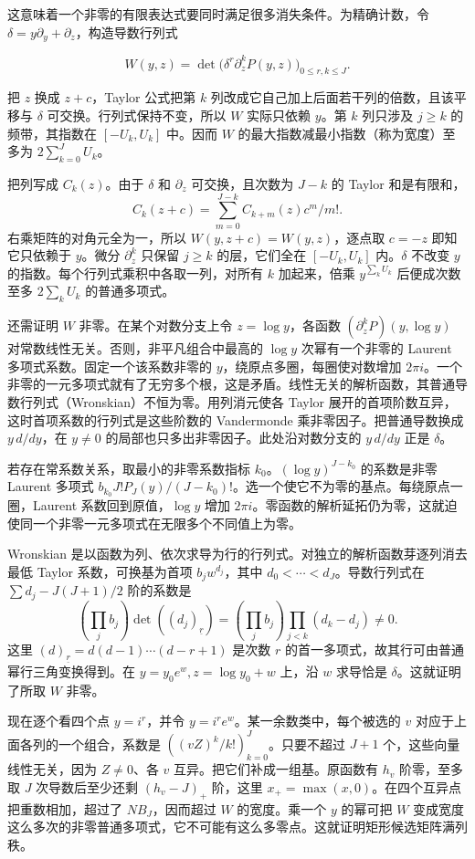 \documentclass[11pt,a4paper]{article}
\begin{document}
这意味着一个非零的有限表达式要同时满足很多消失条件。为精确计数，令 \(\delta=y\partial_y+\partial_z\)，构造导数行列式

\[
 W(y,z)=\det\big(\delta^r\partial_z^k P(y,z)\big)_{0\le r,k\le J}.
\]

把 \(z\) 换成 \(z+c\)，Taylor 公式把第 \(k\) 列改成它自己加上后面若干列的倍数，且该平移与 \(\delta\) 可交换。行列式保持不变，所以 \(W\) 实际只依赖 \(y\)。第 \(k\) 列只涉及 \(j\ge k\) 的频带，其指数在 \([-U_k,U_k]\) 中。因而 \(W\) 的最大指数减最小指数（称为宽度）至多为 \(2\sum_{k=0}^J U_k\)。

把列写成 \(C_k(z)\)。由于 \(\delta\) 和 \(\partial_z\) 可交换，且次数为 \(J-k\) 的 Taylor 和是有限和， \[
 C_k(z+c)=\sum_{m=0}^{J-k}C_{k+m}(z)c^m/m!.
\] 右乘矩阵的对角元全为一，所以 \(W(y,z+c)=W(y,z)\)，逐点取 \(c=-z\) 即知它只依赖于 \(y\)。微分 \(\partial_z^k\) 只保留 \(j\ge k\) 的层，它们全在 \([-U_k,U_k]\) 内。\(\delta\) 不改变 \(y\) 的指数。每个行列式乘积中各取一列，对所有 \(k\) 加起来，倍乘 \(y^{\sum_kU_k}\) 后便成次数至多 \(2\sum_k U_k\) 的普通多项式。

还需证明 \(W\) 非零。在某个对数分支上令 \(z=\log y\)，各函数 \((\partial_z^kP)(y,\log y)\) 对常数线性无关。否则，非平凡组合中最高的 \(\log y\) 次幂有一个非零的 Laurent 多项式系数。固定一个该系数非零的 \(y\)，绕原点多圈，每圈使对数增加 \(2\pi i\)。一个非零的一元多项式就有了无穷多个根，这是矛盾。线性无关的解析函数，其普通导数行列式（Wronskian）不恒为零。用列消元使各 Taylor 展开的首项阶数互异，这时首项系数的行列式是这些阶数的 Vandermonde 乘非零因子。把普通导数换成 \(y\,d/dy\)，在 \(y\ne0\) 的局部也只多出非零因子。此处沿对数分支的 \(y\,d/dy\) 正是 \(\delta\)。

若存在常系数关系，取最小的非零系数指标 \(k_0\)。\((\log y)^{J-k_0}\) 的系数是非零 Laurent 多项式 \(b_{k_0}J!P_J(y)/(J-k_0)!\)。选一个使它不为零的基点。每绕原点一圈，Laurent 系数回到原值，\(\log y\) 增加 \(2\pi i\)。零函数的解析延拓仍为零，这就迫使同一个非零一元多项式在无限多个不同值上为零。

Wronskian 是以函数为列、依次求导为行的行列式。对独立的解析函数芽逐列消去最低 Taylor 系数，可换基为首项 \(b_jw^{d_j}\)，其中 \(d_0<\cdots<d_J\)。导数行列式在 \(\sum d_j-J(J+1)/2\) 阶的系数是 \[
 \left(\prod_j b_j\right)\det((d_j)_{\underline r})
 =\left(\prod_j b_j\right)\prod_{j<k}(d_k-d_j)\ne0 .
\] 这里 \((d)_{\underline r}=d(d-1)\cdots(d-r+1)\) 是次数 \(r\) 的首一多项式，故其行可由普通幂行三角变换得到。在 \(y=y_0e^w,z=\log y_0+w\) 上，沿 \(w\) 求导恰是 \(\delta\)。这就证明了所取 \(W\) 非零。

现在逐个看四个点 \(y=i^r\)，并令 \(y=i^r e^w\)。某一余数类中，每个被选的 \(v\) 对应于上面各列的一个组合，系数是 \(((vZ)^k/k!)_{k=0}^{J}\)。只要不超过 \(J+1\) 个，这些向量线性无关，因为 \(Z\ne0\)、各 \(v\) 互异。把它们补成一组基。原函数有 \(h_v\) 阶零，至多取 \(J\) 次导数后至少还剩 \((h_v-J)_+\) 阶，这里 \(x_+=\max(x,0)\)。在四个互异点把重数相加，超过了 \(NB_J\)，因而超过 \(W\) 的宽度。乘一个 \(y\) 的幂可把 \(W\) 变成宽度这么多次的非零普通多项式，它不可能有这么多零点。这就证明矩形候选矩阵满列秩。
\end{document}
